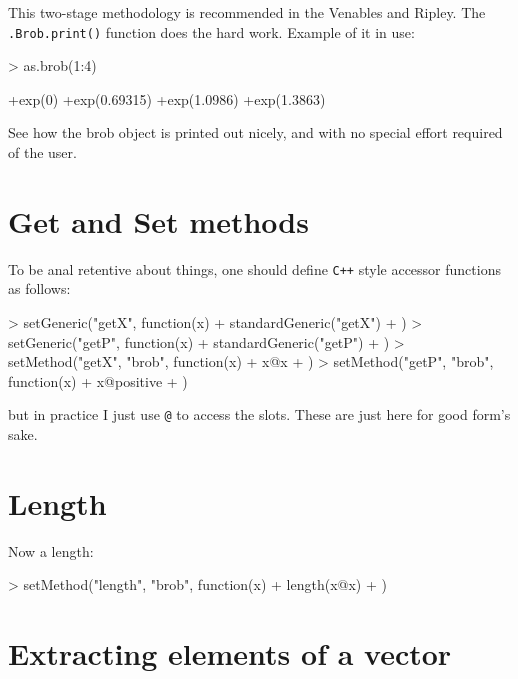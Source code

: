 \documentclass[a4paper]{article}
\begin{document}
This two-stage methodology is recommended in the Venables and Ripley.
The {\tt .Brob.print()} function does the hard work.  Example of it in
use:

\begin{Schunk}
\begin{Sinput}
> as.brob(1:4)
\end{Sinput}
\begin{Soutput}
[1] +exp(0)       +exp(0.69315) +exp(1.0986)  +exp(1.3863) 
\end{Soutput}
\end{Schunk}

See how the brob object is printed out nicely, and with no special
effort required of the user.


\section{Get and Set methods}

To be anal retentive about things, one should define {\tt C++} style
accessor functions as follows:

\begin{Schunk}
\begin{Sinput}
> setGeneric("getX", function(x) {
+     standardGeneric("getX")
+ })
> setGeneric("getP", function(x) {
+     standardGeneric("getP")
+ })
> setMethod("getX", "brob", function(x) {
+     x@x
+ })
> setMethod("getP", "brob", function(x) {
+     x@positive
+ })
\end{Sinput}
\end{Schunk}

but in practice I just use {\tt @} to access the slots.  These are
just here for good form's sake.


\section{Length}

Now a length:

\begin{Schunk}
\begin{Sinput}
> setMethod("length", "brob", function(x) {
+     length(x@x)
+ })
\end{Sinput}
\end{Schunk}

\section{Extracting elements of a vector}
\end{document}

